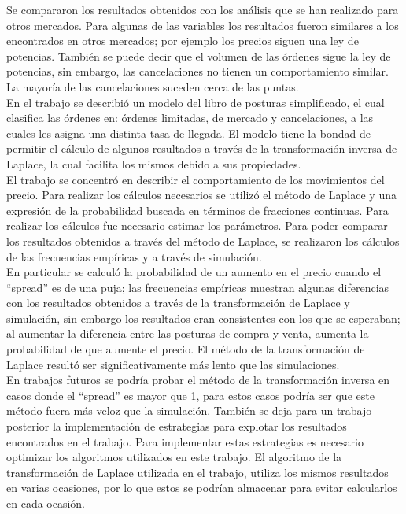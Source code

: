 \documentclass[11pt]{article}
\numberwithin{equation}{section} %
\begin{document}
Se compararon los resultados obtenidos con los análisis que se han realizado para otros mercados. Para algunas de las variables los resultados fueron similares a los encontrados en otros mercados; por ejemplo los precios siguen una ley de potencias. También se puede decir que el volumen de las órdenes sigue la ley de potencias, sin embargo, las cancelaciones no tienen un comportamiento similar. La mayoría de las cancelaciones suceden cerca de las puntas.\\

En el trabajo se describió un modelo del libro de posturas simplificado, el cual clasifica las órdenes en: órdenes limitadas, de mercado y cancelaciones, a las cuales les asigna una distinta tasa de llegada. El modelo tiene la bondad de permitir el cálculo de algunos resultados a través de la transformación inversa de Laplace, la cual facilita los mismos debido a sus propiedades.\\

El trabajo se concentró en describir el comportamiento de los movimientos del precio. Para realizar los cálculos necesarios se utilizó el método de Laplace y una expresión de la probabilidad buscada en términos de fracciones continuas. Para realizar los cálculos fue necesario estimar los parámetros. Para poder comparar los resultados obtenidos a través del método de Laplace, se realizaron los cálculos de las frecuencias empíricas y a través de simulación.\\

En particular se calculó la probabilidad de un aumento en el precio cuando el ``spread'' es de una puja; las frecuencias empíricas muestran algunas diferencias con los resultados obtenidos a través de la transformación de Laplace y simulación, sin embargo los resultados eran consistentes con los que se esperaban; al aumentar la diferencia entre las posturas de compra y venta, aumenta la probabilidad de que aumente el precio. El método de la transformación de Laplace resultó ser significativamente más lento que las simulaciones.\\

En trabajos futuros se podría probar el método de la transformación inversa en casos donde el ``spread'' es mayor que 1, para estos casos podría ser que este método fuera más veloz que la simulación. También se deja para un trabajo posterior la implementación de estrategias para explotar los resultados encontrados en el trabajo. Para implementar estas estrategias es necesario optimizar los algoritmos utilizados en este trabajo. El algoritmo de la transformación de Laplace utilizada en el trabajo, utiliza los mismos resultados en varias ocasiones, por lo que estos se podrían almacenar para evitar calcularlos en cada ocasión.\\
\end{document}
